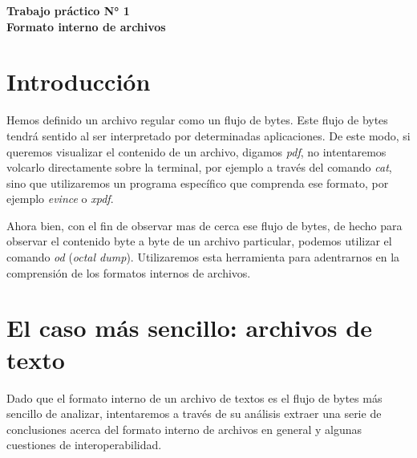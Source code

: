 \documentclass[12pt]{article}
\def\maketitle{

\makeatletter
{\color{bl} \centering \huge \sc \textbf{ Trabajo práctico N° 1\\ \large
\vspace*{-8pt} \color{black} Formato interno de archivos \vspace*{8pt} }\par}
\makeatother

\makeatletter


}
\begin{document}
\thispagestyle{empty}
\maketitle
\setlength{\parindent}{0pt}


\section*{Introducción}

Hemos definido un archivo regular como un flujo de bytes. Este flujo de bytes
tendrá sentido al ser interpretado por determinadas aplicaciones. De este
modo, si queremos visualizar el contenido de un archivo, digamos \emph{pdf},
no intentaremos volcarlo directamente sobre la terminal, por ejemplo a través
del comando \emph{cat}, sino que utilizaremos un programa específico que
comprenda ese formato, por ejemplo \emph{evince} o \emph{xpdf}. 

Ahora bien, con el fin de observar mas de cerca ese flujo de bytes, de hecho
para observar el contenido byte a byte de un archivo particular, podemos
utilizar el comando \emph{od} (\emph{octal dump}). Utilizaremos esta
herramienta para adentrarnos en la comprensión de los formatos internos de
archivos.

\section*{El caso más sencillo: archivos de texto}

Dado que el formato interno de un archivo de textos es el flujo de bytes más
sencillo de analizar, intentaremos a través de su análisis extraer una serie 
de conclusiones acerca del formato interno de archivos en general y algunas 
cuestiones de interoperabilidad. 
\end{document}
